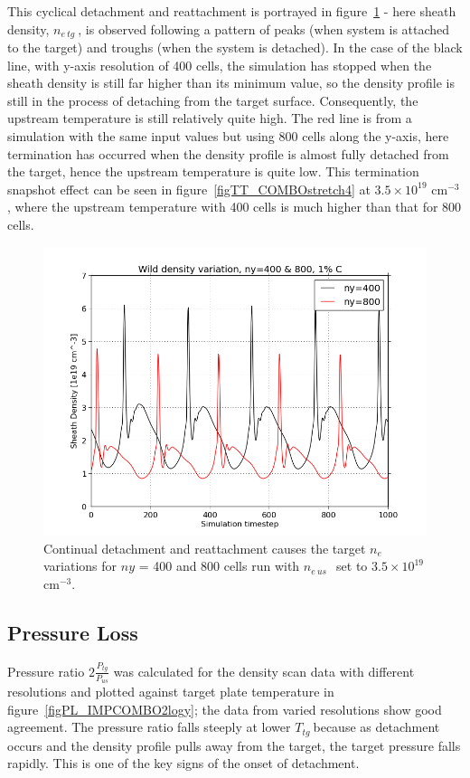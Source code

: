 \documentclass[12pt]{article}  %
\providecommand{\noNe}[1]{{${#1}\times 10^{19}$ cm$^{-3}$}} %
\providecommand{\neus}{$n_{e~us}~$} %
\providecommand{\netg}{$n_{e~tg}~$} %
\providecommand{\Ttg}{$T_{tg}~$} %
\begin{document}
This cyclical detachment and reattachment is portrayed in figure~\ref{figny400800r35netg} - here sheath density, \netg, is observed following a pattern of peaks (when system is attached to the target) and troughs (when the system is detached). In the case of the black line, with y-axis resolution of 400 cells, the simulation has stopped when the sheath density is still far higher than its minimum value, so the density profile is still in the process of detaching from the target surface. Consequently, the upstream temperature is still relatively quite high. The red line is from a simulation with the same input values but using 800 cells along the y-axis, here termination has occurred when the density profile is almost fully detached from the target, hence the upstream temperature is quite low. This termination snapshot effect can be seen in figure~\ref{figTT_COMBOstretch4} at \noNe{3.5}, where the upstream temperature with 400 cells is much higher than that for 800 cells.

\begin{figure}
\includegraphics[scale=0.5]{Figures/sol1d/ny400800r35netg.png}
\centering
\caption{Continual detachment and reattachment causes the target $n_e$ variations for $ny$ = 400 and 800 cells run with \neus~set to \noNe{3.5}.}\label{figny400800r35netg}
\end{figure}

\subsection{Pressure Loss}\label{ssecPloss}
Pressure ratio $2\frac{P_{tg}}{P_{us}}$ was calculated for the density scan data with different resolutions and plotted against target plate temperature in figure~\ref{figPL_IMPCOMBO2logy}; the data from varied resolutions show good agreement. The pressure ratio falls steeply at lower \Ttg because as detachment occurs and the density profile pulls away from the target, the target pressure falls rapidly. This is one of the key signs of the onset of detachment.
\end{document}
